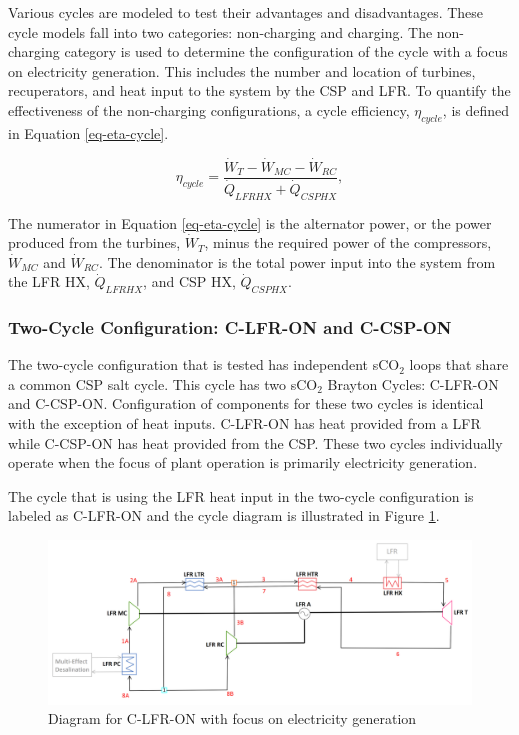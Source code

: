 \begin{paracol}{2}
Various cycles are modeled to test their advantages and disadvantages. These cycle models fall into two categories: non-charging and charging. The non-charging category is used to determine the configuration of the cycle with a focus on electricity generation. This includes the number and location of turbines, recuperators, and heat input to the system by the CSP and LFR. To quantify the effectiveness of the non-charging configurations, a cycle efficiency, $\eta_{cycle}$, is defined in Equation \ref{eq-eta-cycle}.

\begin{equation}
    \label{eq-eta-cycle}
    \eta_{cycle} = \frac{\dot{W}_{T}-\dot{W}_{MC}-\dot{W}_{RC}}{\dot{Q}_{LFRHX}+\dot{Q}_{CSPHX}},
\end{equation}

The numerator in Equation \ref{eq-eta-cycle} is the alternator power, or the power produced from the turbines, $\dot{W}_{T}$, minus the required power of the compressors, $\dot{W}_{MC}$ and $\dot{W}_{RC}$. The denominator is the total power input into the system from the LFR HX, $\dot{Q}_{LFRHX}$, and CSP HX, $\dot{Q}_{CSPHX}$.


\subsubsection{Two-Cycle Configuration: C-LFR-ON and C-CSP-ON} %

The two-cycle configuration that is tested has independent sCO$_{2}$ loops that share a common CSP salt cycle. This cycle has two sCO$_{2}$ Brayton Cycles: C-LFR-ON and C-CSP-ON. Configuration of components for these two cycles is identical with the exception of heat inputs. C-LFR-ON has heat provided from a LFR while C-CSP-ON has heat provided from the CSP. These two cycles individually operate when the focus of plant operation is primarily electricity generation. 
    
The cycle that is using the LFR heat input in the two-cycle configuration is labeled as C-LFR-ON and the cycle diagram is illustrated in Figure \ref{c-lfr-on}. 

\end{paracol}
\begin{figure}[H] 
    \widefigure
    \includegraphics[width=\linewidth]{Definitions/c-lfr-on.pdf}
    \caption{Diagram for C-LFR-ON with focus on electricity generation\label{c-lfr-on}}
\end{figure}
